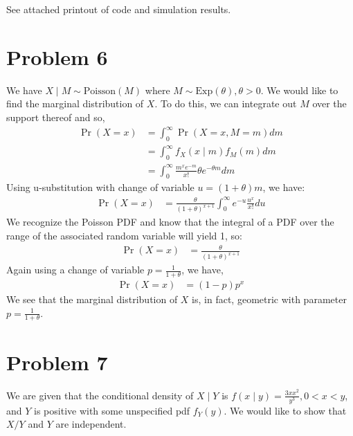 \documentclass[11pt]{article}
\begin{document}
\begin{enumerate}[(a)]
\begin{enumerate}[(a)]
  See attached printout of code and simulation results.

\end{enumerate}

\section*{Problem 6}

We have $X \mid M \sim \mathrm{Poisson}(M)$ where $M \sim
\mathrm{Exp}(\theta), \theta > 0$.  We would like to find the marginal
distribution of $X$.  To do this, we can integrate out $M$ over the
support thereof and so,
\begin{align*}
  \Pr{(X = x)} &= \int_0^{\infty} \Pr{(X=x,M=m)} dm \\
  &= \int_0^{\infty} f_X(x \mid m) f_M(m) dm \\
  &= \int_0^{\infty} \frac{m^x e^{-m}}{x!}
    \theta e^{-\theta m} dm
\end{align*}
Using u-substitution with change of variable $u = (1+\theta)m$, we
have:
\begin{align*}
  \Pr{(X=x)} &= \frac{\theta}{(1+\theta)^{x+1}} \int_0^{\infty} e^{-u}
               \frac{u^x}{x!} du
\end{align*}
We recognize the Poisson PDF and know that the integral of a PDF over
the range of the associated random variable will yield 1, so:
\begin{align*}
  \Pr{(X=x)} &= \frac{\theta}{(1+\theta)^{x+1}}
\end{align*}
Again using a change of variable $p = \frac{1}{1+\theta}$, we have,
\begin{align*}
  \Pr{(X=x)} &= (1-p)p^x
\end{align*}
We see that the marginal distribution of $X$ is, in fact, geometric with parameter $p =
\frac{1}{1+\theta}$.

\newpage

\section*{Problem 7}

We are given that the conditional density of $X \mid Y$ is $f(x \mid
y) = \frac{3xx^2}{y^3}, 0<x<y$, and $Y$ is positive with some
unspecified pdf $f_Y(y)$.  We would like to show that $X/Y$ and $Y$
are independent.


\end{enumerate}
\end{document}
